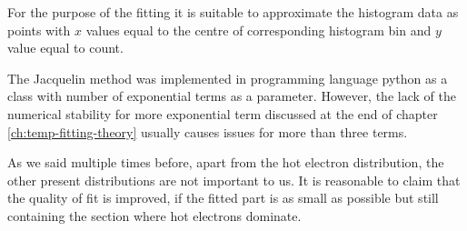 For the purpose of the fitting it is suitable to approximate the histogram data as points with $x$ values equal to the centre of corresponding histogram bin and $y$ value equal to count.

The Jacquelin method was implemented in programming language python as a class with number of exponential terms as a parameter. However, the lack of the numerical stability for more exponential term discussed at the end of chapter \ref{ch:temp-fitting-theory} usually causes issues for more than three terms.

As we said multiple times before, apart from the hot electron distribution, the other present distributions are not important to us. It is reasonable to claim that the quality of fit is improved, if the fitted part is as small as possible but still containing the section where hot electrons dominate.
